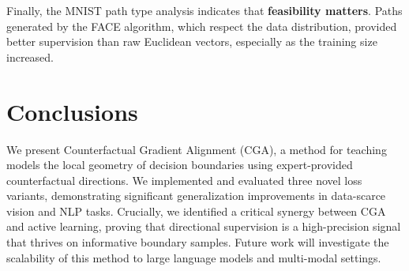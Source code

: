 \documentclass[sigconf,anonymous]{aamas}
\begin{document}
Finally, the MNIST path type analysis indicates that \textbf{feasibility matters}. Paths generated by the FACE algorithm, which respect the data distribution, provided better supervision than raw Euclidean vectors, especially as the training size increased.

\section{Conclusions}
We present Counterfactual Gradient Alignment (CGA), a method for teaching models the local geometry of decision boundaries using expert-provided counterfactual directions. We implemented and evaluated three novel loss variants, demonstrating significant generalization improvements in data-scarce vision and NLP tasks. Crucially, we identified a critical synergy between CGA and active learning, proving that directional supervision is a high-precision signal that thrives on informative boundary samples. Future work will investigate the scalability of this method to large language models and multi-modal settings.

\balance



\end{document}
